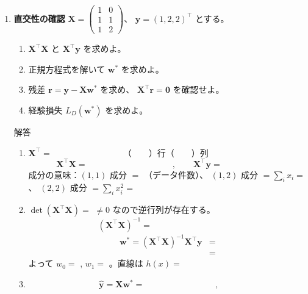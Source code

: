 \documentclass[a4paper,dvipdfmx]{jsarticle}
\newcommand{\提出期限}{2026年10月19日（月）}
\newcommand{\学籍番号}{0000000}
\newcommand{\氏名}{氏名を書く}
\newcommand{\提出日}{2026年10月19日}
\newenvironment{answer}{\begin{itembox}[l]{解答}}{\end{itembox}}
\begin{document}
\begin{enumerate}

  \item \textbf{直交性の確認}\quad
    $\bm{X} = \begin{pmatrix} 1 & 0 \\ 1 & 1 \\ 1 & 2 \end{pmatrix}$、
    $\bm{y} = (1, 2, 2)^\top$ とする。
    \begin{enumerate}
      \item $\bm{X}^\top\bm{X}$ と $\bm{X}^\top\bm{y}$ を求めよ。
      \item 正規方程式を解いて $\bm{w}^*$ を求めよ。
      \item 残差 $\bm{r} = \bm{y} - \bm{X}\bm{w}^*$ を求め、
        $\bm{X}^\top\bm{r} = \bm{0}$ を確認せよ。
      \item 経験損失 $L_D(\bm{w}^*)$ を求めよ。
    \end{enumerate}
    \begin{answer}
      \begin{enumerate}
        \item $\bm{X}^\top = \phantom{XXXXXXXXXX}$（　　）行（　　）列
          \begin{equation*}
            \bm{X}^\top\bm{X} = \phantom{XXXXXXXXXXXX}, \qquad
            \bm{X}^\top\bm{y} = \phantom{XXXXXXXX}
          \end{equation*}
          成分の意味：$(1,1)$ 成分 $=$ \phantom{XXXX}（データ件数）、
          $(1,2)$ 成分 $= \sum_i x_i =$ \phantom{XX}、
          $(2,2)$ 成分 $= \sum_i x_i^2 =$ \phantom{XX}
        \item $\det(\bm{X}^\top\bm{X}) = $ \phantom{XXXXXX} $\neq 0$ なので逆行列が存在する。
          \begin{equation*}
            (\bm{X}^\top\bm{X})^{-1} = \phantom{XXXXXXXXXXXX}
          \end{equation*}
          \begin{align*}
            \bm{w}^* = (\bm{X}^\top\bm{X})^{-1}\bm{X}^\top\bm{y}
              &= \\
              &=
          \end{align*}
          よって $w_0 = $ \phantom{XXX}, $w_1 = $ \phantom{XXX}。直線は $h(x) = $ \phantom{XXXXXXXX}
        \item
          \begin{equation*}
            \hat{\bm{y}} = \bm{X}\bm{w}^* = \phantom{XXXXXXXXXX}, \qquad

\end{equation*}
\end{enumerate}
\end{answer}
\end{enumerate}
\end{document}
